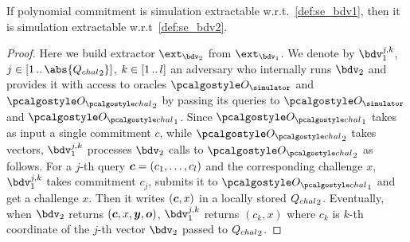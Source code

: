 \documentclass[runningheads,11pt]{llncs}
\let\spvec\vec
\let\vec\accentvec
\let\spvec\vec
\let\vec\spvec
\def\vec#1{\mathchoice{\mbox{\boldmath$\displaystyle#1$}}
  {\mbox{\boldmath$\textstyle#1$}} {\mbox{\boldmath$\scriptstyle#1$}}
  {\mbox{\boldmath$\scriptscriptstyle#1$}}}
\begin{document}
\begin{lemma}[]
  If polynomial commitment is simulation extractable w.r.t.~\cref{def:se_bdv1}, then
  it is simulation extractable w.r.t~\cref{def:se_bdv2}.
\end{lemma}
\begin{proof}
  Here we build extractor $\ext_{\bdv_2}$ from $\ext_{\bdv_1}$. We denote by
  $\bdv_1^{j,k}$, $j \in \range{1}{\abs{\Qchal_2}}$, $k \in [1 \, .. \, l]$
   an adversary who
  internally runs $\bdv_2$ and provides it with access to oracles $\oracles$ and
  $\oraclec_2$ by passing its queries to $\oracles$ and $\oraclec_1$. Since
  $\oraclec_1$ takes as input a single commitment $c$, while $\oraclec_2$ takes
  vectors, $\bdv_1^{j, k}$ processes $\bdv_2$ calls to $\oraclec_2$ as follows. For a
  $j$-th query $\vec{c} = (c_1, \ldots, c_l)$ and the corresponding challenge $x$,
  $\bdv_1^{j, k}$ takes commitment $c_j$, submits it to $\oraclec_1$ and get a
  challenge $x$. Then it writes $(\vec{c}, x)$ in a locally stored
  ${Q_{chal}}_2$. Eventually, when $\bdv_2$ returns $(\vec{c}, x, \vec{y}, \vec{o})$,
  $\bdv_1^{j, k}$ returns $(c_k, x)$ where $c_k$ is $k$-th coordinate of the $j$-th
  vector $\bdv_2$ passed to ${Q_{chal}}_2$.
\end{proof}
\end{document}
